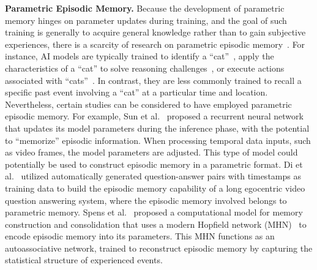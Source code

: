 \documentclass[journal,hideappendix]{vgtc}
\newenvironment{j_itemize}{
\begin{itemize}[]
  \setlength{\itemsep}{3pt}
  \setlength{\parskip}{0pt}
  \setlength{\parsep}{0pt}
}{\end{itemize}}
\begin{document}
\begin{j_itemize}

    \item[$\bullet$] \textbf{Parametric Episodic Memory.} Because the development of parametric memory hinges on parameter updates during training, and the goal of such training is generally to acquire general knowledge rather than to gain subjective experiences, there is a scarcity of research on parametric episodic memory~\cite{li2021survey,nandwani2021review,guo2018review,li2020survey}. For instance, AI models are typically trained to identify a ``cat''~\cite{he2016deep,li2021survey}, apply the characteristics of a ``cat'' to solve reasoning challenges~\cite{heinzerlinginui2021language,mallen2023trust}, or execute actions associated with ``cats''~\cite{kaelbling1996reinforcement}. In contrast, they are less commonly trained to recall a specific past event involving a ``cat'' at a particular time and location. Nevertheless, certain studies can be considered to have employed parametric episodic memory. For example, Sun et al.~\cite{sun2024learning} proposed a recurrent neural network that updates its model parameters during the inference phase, with the potential to ``memorize'' episodic information. When processing temporal data inputs, such as video frames, the model parameters are adjusted. This type of model could potentially be used to construct episodic memory in a parametric format. Di et al.~\cite{di2024grounded} utilized automatically generated question-answer pairs with timestamps as training data to build the episodic memory capability of a long egocentric video question answering system, where the episodic memory involved belongs to parametric memory. Spens et al.~\cite{spens2024generative} proposed a computational model for memory construction and consolidation that uses a modern Hopfield network (MHN)~\cite{ramsauer2020hopfield} to encode episodic memory into its parameters. This MHN functions as an autoassociative network, trained to reconstruct episodic memory by capturing the statistical structure of experienced events.
    

\end{j_itemize}
\end{document}
